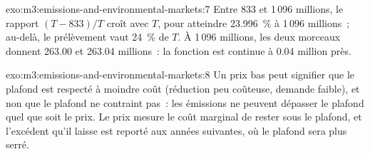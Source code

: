 \begin{solution}{exo:m3:emissions-and-environmental-markets:7}
Entre 833 et 1\,096 millions, le rapport $(T - 833)/T$ croît avec $T$, pour atteindre 23.996~\% à 1\,096
millions~; au-delà, le prélèvement vaut 24~\% de $T$. À 1\,096 millions, les deux morceaux donnent 263.00 et 263.04
millions~: la fonction est continue à 0.04 million près.
\end{solution}

\begin{solution}{exo:m3:emissions-and-environmental-markets:8}
Un prix bas peut signifier que le plafond est respecté à moindre coût (réduction peu coûteuse, demande faible), et non que
le plafond ne contraint pas~: les émissions ne peuvent dépasser le plafond quel que soit le prix. Le prix mesure le coût marginal de
rester sous le plafond, et l'excédent qu'il laisse est reporté aux années suivantes, où le plafond sera plus serré.
\end{solution}

